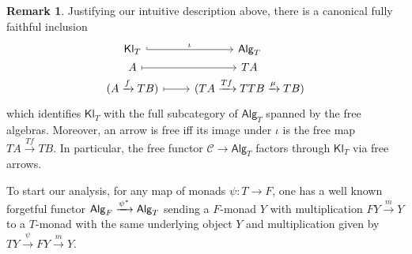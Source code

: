 \documentclass[a4paper,10pt
,draft
]{article}%
\numberwithin{equation}{section}
\numberwithin{figure}{section}
\theoremstyle{definition} %
\newtheorem{remark}[equation]{Remark}%
\newcommand{\Alg}{\mathsf{Alg}}
\newcommand{\Kl}{\mathsf{Kl}}
\newcommand{\1}{\ensuremath{\mathbbm 1}}%
\begin{document}
\begin{remark}\label{KLEISLIDEF REM}
      Justifying our intuitive description above,
      there is a canonical fully faithful inclusion
      \[
            \begin{tikzcd}[row sep = 0pt]
                  \Kl_T \ar[hookrightarrow]{r}{\iota} &
                  \Alg_T
                  \\
                  A \ar[mapsto]{r} &
                  TA
                  \\
                  (A \xrightarrow{f} TB) \ar[mapsto]{r} &
                  (TA \xrightarrow{Tf} TTB \xrightarrow{\mu} TB) 
            \end{tikzcd} 
      \]
      which identifies $\mathsf{Kl}_T$ with the full subcategory of
      $\mathsf{Alg}_T$ spanned by the free algebras.
      Moreover, an arrow is free iff
      its image under $\iota$
      is the free map
      $TA \xrightarrow{Tf} TB$.
      In particular, the free functor $\mathcal C \to \Alg_T$ factors through $\Kl_T$ via free arrows.
\end{remark}


To start our analysis,
for any map of monads $\psi \colon T \to F$,
one has a well known forgetful functor 
$\mathsf{Alg}_F \xrightarrow{\psi^{\**}} \mathsf{Alg}_T$
sending a $F$-monad $Y$ with multiplication
$FY \xrightarrow{m} Y$
to a $T$-monad with the same underlying object $Y$
and multiplication given by
$TY \xrightarrow{\psi} FY \xrightarrow{m} Y$.
\end{document}
